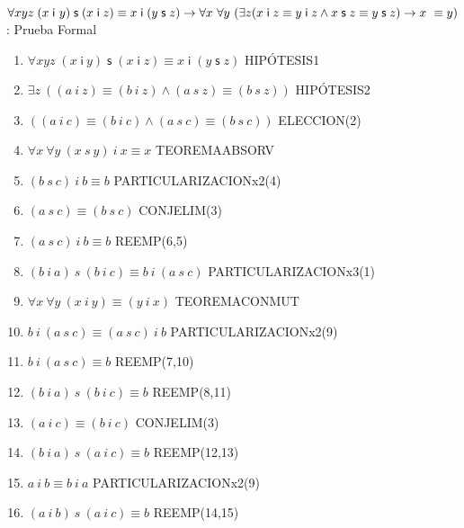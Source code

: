 \documentclass[10pt]{beamer}
\newcounter{saveenumi}
\newcommand{\seti}{\setcounter{saveenumi}{\value{enumi}}}
\newcommand{\Cfonta}{\fontsize{6.7}{9.5}\selectfont}
\newcommand{\Cfont}{\fontsize{5.5}{7.2}\selectfont}
\newcommand{\Cfonti}{\fontsize{8.5}{7.2}\selectfont}
\newcommand{\Nand}{\wedge}
\newcommand{\idistr}{\forall xyz\;(x\;\mathsf{i}\
y)\;\mathsf{s}\;(x\;\mathsf{i}\;z)\equiv x\;\mathsf{i}\;(y\;\mathsf{s}%
\;z)}
\newcommand{\myconj}{x\;\mathsf{i}\;z\equiv y\;\mathsf{%
i}\;z\wedge x\;\mathsf{s}\;z\equiv y\;\mathsf{s}\;z}
\begin{document}
\begin{frame}{\Cfonti$\idistr \rightarrow \forall x\ \forall y\ (\exists z (\myconj) \rightarrow x\ \equiv y)$:
    Prueba Formal
}
\Cfont
  \begin{enumerate}[<+->]
    \Cfonta
    \item $ \idistr $ \hfill HIPÓTESIS1
    \item $ \exists z\ ((a\ i\ z) \equiv (b\ i\ z) \Nand (a\ s\ z) \equiv (b\ s\ z))$ \hfill HIPÓTESIS2
    \item $ ((a\ i\ c) \equiv (b\ i\ c) \Nand (a\ s\ c) \equiv (b\ s\ c))$ \hfill ELECCION(2)
    \item $ \forall x\ \forall y\ (x\ s\ y)\ i\ x \equiv x$ \hfill TEOREMAABSORV
    \item $ (b\ s\ c)\ i\ b \equiv b$ \hfill PARTICULARIZACIONx2(4)
    \item $ (a\ s\ c) \equiv (b\ s\ c) $ \hfill CONJELIM(3)

    \item $ (a\ s\ c)\ i\ b \equiv b$ \hfill REEMP(6,5)
    \item $ (b\ i\ a)\ s\ (b\ i\ c) \equiv b\ i\ (a\ s\ c) $ \hfill PARTICULARIZACIONx3(1)
    \item $\forall x\ \forall y\ (x\ i\ y) \equiv (y\ i\ x)$ \hfill TEOREMACONMUT
    \item $b\ i\ (a\ s\ c) \equiv (a\ s\ c)\ i\ b $ \hfill PARTICULARIZACIONx2(9)
    \item $ b\ i\ (a\ s\ c) \equiv b$ \hfill REEMP(7,10)
    \item $ (b\ i\ a)\ s\ (b\ i\ c) \equiv b$ \hfill REEMP(8,11)
    \item $ (a\ i\ c) \equiv (b\ i\ c) $ \hfill CONJELIM(3)

    \item $ (b\ i\ a)\ s\ (a\ i\ c) \equiv b$ \hfill REEMP(12,13)
    \item $a\ i\ b \equiv b\ i\ a $ \hfill PARTICULARIZACIONx2(9)

    \item $ (a\ i\ b)\ s\ (a\ i\ c) \equiv b$ \hfill REEMP(14,15)
    \seti


  \end{enumerate}
  \setcounter{equation}{0}

\end{frame}
\end{document}
